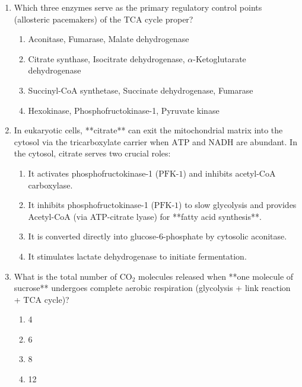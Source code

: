 \documentclass[11pt, a4paper]{article}
\begin{document}
\begin{enumerate}[label=\textbf{\arabic*.}]
\item Which three enzymes serve as the primary regulatory control points (allosteric pacemakers) of the TCA cycle proper?
\begin{enumerate}[label=(\Alph*)]
    \item Aconitase, Fumarase, Malate dehydrogenase
    \item Citrate synthase, Isocitrate dehydrogenase, $\alpha$-Ketoglutarate dehydrogenase
    \item Succinyl-CoA synthetase, Succinate dehydrogenase, Fumarase
    \item Hexokinase, Phosphofructokinase-1, Pyruvate kinase
\end{enumerate}

\item In eukaryotic cells, **citrate** can exit the mitochondrial matrix into the cytosol via the tricarboxylate carrier when $\text{ATP}$ and $\text{NADH}$ are abundant. In the cytosol, citrate serves two crucial roles:
\begin{enumerate}[label=(\Alph*)]
    \item It activates phosphofructokinase-1 ($\text{PFK-1}$) and inhibits acetyl-CoA carboxylase.
    \item It inhibits phosphofructokinase-1 ($\text{PFK-1}$) to slow glycolysis and provides Acetyl-CoA (via ATP-citrate lyase) for **fatty acid synthesis**.
    \item It is converted directly into glucose-6-phosphate by cytosolic aconitase.
    \item It stimulates lactate dehydrogenase to initiate fermentation.
\end{enumerate}

\item What is the total number of $\text{CO}_2$ molecules released when **one molecule of sucrose** undergoes complete aerobic respiration (glycolysis + link reaction + TCA cycle)?
\begin{enumerate}[label=(\Alph*)]
    \item 4
    \item 6
    \item 8
    \item 12
\end{enumerate}


\end{enumerate}
\end{document}
